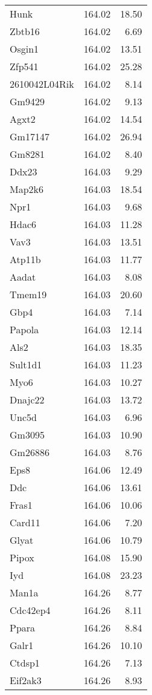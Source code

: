 \documentclass[oneside]{book}
\begin{document}
{\begin{longtable}{lrr}
  Hunk & 164.02 & 18.50 \\
  Zbtb16 & 164.02 & 6.69 \\
  Osgin1 & 164.02 & 13.51 \\
  Zfp541 & 164.02 & 25.28 \\
  2610042L04Rik & 164.02 & 8.14 \\
  Gm9429 & 164.02 & 9.13 \\
  Agxt2 & 164.02 & 14.54 \\
  Gm17147 & 164.02 & 26.94 \\
  Gm8281 & 164.02 & 8.40 \\
  Ddx23 & 164.03 & 9.29 \\
  Map2k6 & 164.03 & 18.54 \\
  Npr1 & 164.03 & 9.68 \\
  Hdac6 & 164.03 & 11.28 \\
  Vav3 & 164.03 & 13.51 \\
  Atp11b & 164.03 & 11.77 \\
  Aadat & 164.03 & 8.08 \\
  Tmem19 & 164.03 & 20.60 \\
  Gbp4 & 164.03 & 7.14 \\
  Papola & 164.03 & 12.14 \\
  Als2 & 164.03 & 18.35 \\
  Sult1d1 & 164.03 & 11.23 \\
  Myo6 & 164.03 & 10.27 \\
  Dnajc22 & 164.03 & 13.72 \\
  Unc5d & 164.03 & 6.96 \\
  Gm3095 & 164.03 & 10.90 \\
  Gm26886 & 164.03 & 8.76 \\
  Eps8 & 164.06 & 12.49 \\
  Ddc & 164.06 & 13.61 \\
  Fras1 & 164.06 & 10.06 \\
  Card11 & 164.06 & 7.20 \\
  Glyat & 164.06 & 10.79 \\
  Pipox & 164.08 & 15.90 \\
  Iyd & 164.08 & 23.23 \\
  Man1a & 164.26 & 8.77 \\
  Cdc42ep4 & 164.26 & 8.11 \\
  Ppara & 164.26 & 8.84 \\
  Galr1 & 164.26 & 10.10 \\
  Ctdsp1 & 164.26 & 7.13 \\
  Eif2ak3 & 164.26 & 8.93 \\

\end{longtable}}
\end{document}
